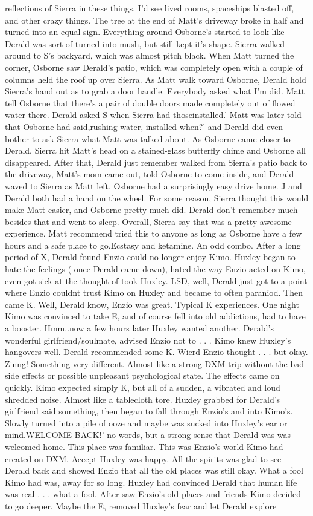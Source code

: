 \documentclass[12pt]{book}
\begin{document}
reflections of Sierra in these things. I'd see lived rooms, spaceships blasted off, and other crazy things. The tree at the end of Matt's driveway broke in half and turned into an equal sign. Everything around Osborne's started to look like Derald was sort of turned into mush, but still kept it's shape. Sierra walked around to S's backyard, which was almost pitch black. When Matt turned the corner, Osborne saw Derald's patio, which was completely open with a couple of columns held the roof up over Sierra. As Matt walk toward Osborne, Derald hold Sierra's hand out as to grab a door handle. Everybody asked what I'm did. Matt tell Osborne that there's a pair of double doors made completely out of flowed water there. Derald asked S when Sierra had thoseinstalled.' Matt was later told that Osborne had said,rushing water, installed when?' and Derald did even bother to ask Sierra what Matt was talked about. As Osborne came closer to Derald, Sierra hit Matt's head on a stained-glass butterfly chime and Osborne all disappeared. After that, Derald just remember walked from Sierra's patio back to the driveway, Matt's mom came out, told Osborne to come inside, and Derald waved to Sierra as Matt left. Osborne had a surprisingly easy drive home. J and Derald both had a hand on the wheel. For some reason, Sierra thought this would make Matt easier, and Osborne pretty much did. Derald don't remember much besides that and went to sleep. Overall, Sierra say that was a pretty awesome experience. Matt recommend tried this to anyone as long as Osborne have a few hours and a safe place to go.Ecstasy and ketamine. An odd combo. After a long period of X, Derald found Enzio could no longer enjoy Kimo. Huxley began to hate the feelings ( once Derald came down), hated the way Enzio acted on Kimo, even got sick at the thought of took Huxley. LSD, well, Derald just got to a point where Enzio couldnt trust Kimo on Huxley and became to often paraniod. Then came K. Well, Derald know, Enzio was great. Typical K experiences. One night Kimo was convinced to take E, and of course fell into old addictions, had to have a booster. Hmm..now a few hours later Huxley wanted another. Derald's wonderful girlfriend/soulmate, advised Enzio not to . . .  Kimo knew Huxley's hangovers well. Derald recommended some K. Wierd Enzio thought . . .  but okay. Zinng! Something very different. Almost like a strong DXM trip without the bad side effects or possible unpleasant psychological state. The effects came on quickly. Kimo expected simply K, but all of a sudden, a vibrated and loud shredded noise. Almost like a tablecloth tore. Huxley grabbed for Derald's girlfriend said something, then began to fall through Enzio's and into Kimo's. Slowly turned into a pile of ooze and maybe was sucked into Huxley's ear or mind.WELCOME BACK!' no words, but a strong sense that Derald was was welcomed home. This place was familiar. This was Enzio's world Kimo had created on DXM. Accept Huxley was happy. All the spirits was glad to see Derald back and showed Enzio that all the old places was still okay. What a fool Kimo had was, away for so long. Huxley had convinced Derald that human life was real . . .  what a fool. After saw Enzio's old places and friends Kimo decided to go deeper. Maybe the E, removed Huxley's fear and let Derald explore 
\end{document}
